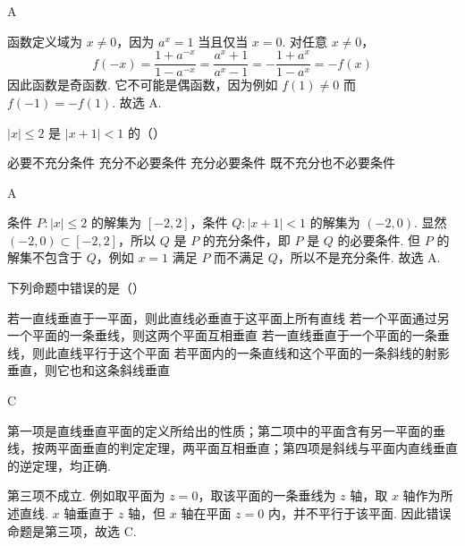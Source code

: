 \begin{answer}
A
\end{answer}

\begin{solution}
函数定义域为 \(x\ne0\)，因为 \(a^x=1\) 当且仅当 \(x=0\). 对任意 \(x\ne0\)，
\[
f(-x)=\frac{1+a^{-x}}{1-a^{-x}}=\frac{a^x+1}{a^x-1}=-\frac{1+a^x}{1-a^x}=-f(x)
\]
因此函数是奇函数. 它不可能是偶函数，因为例如 \(f(1)\ne0\) 而 \(f(-1)=-f(1)\). 故选 A.
\end{solution}

\begin{problem}
\(|x|\leqslant2\) 是 \(|x+1|<1\) 的（\quad）

\choices
    {必要不充分条件}
    {充分不必要条件}
    {充分必要条件}
    {既不充分也不必要条件}
\end{problem}

\begin{answer}
A
\end{answer}

\begin{solution}
条件 \(P:|x|\leqslant2\) 的解集为 \([-2,2]\)，条件 \(Q:|x+1|<1\) 的解集为 \((-2,0)\). 显然 \((-2,0)\subset[-2,2]\)，所以 \(Q\) 是 \(P\) 的充分条件，即 \(P\) 是 \(Q\) 的必要条件. 但 \(P\) 的解集不包含于 \(Q\)，例如 \(x=1\) 满足 \(P\) 而不满足 \(Q\)，所以不是充分条件. 故选 A.
\end{solution}

\begin{problem}
下列命题中错误的是（\quad）

\choices
    {若一直线垂直于一平面，则此直线必垂直于这平面上所有直线}
    {若一个平面通过另一个平面的一条垂线，则这两个平面互相垂直}
    {若一直线垂直于一个平面的一条垂线，则此直线平行于这个平面}
    {若平面内的一条直线和这个平面的一条斜线的射影垂直，则它也和这条斜线垂直}
\end{problem}

\begin{answer}
C
\end{answer}

\begin{solution}
第一项是直线垂直平面的定义所给出的性质；第二项中的平面含有另一平面的垂线，按两平面垂直的判定定理，两平面互相垂直；第四项是斜线与平面内直线垂直的逆定理，均正确.

第三项不成立. 例如取平面为 \(z=0\)，取该平面的一条垂线为 \(z\) 轴，取 \(x\) 轴作为所述直线. \(x\) 轴垂直于 \(z\) 轴，但 \(x\) 轴在平面 \(z=0\) 内，并不平行于该平面. 因此错误命题是第三项，故选 C.
\end{solution}

